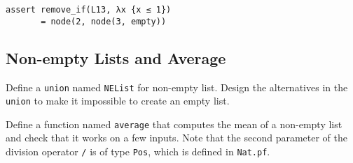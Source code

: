 \documentclass[12pt]{article}
\begin{document}
\begin{verbatim}
assert remove_if(L13, λx {x ≤ 1}) 
       = node(2, node(3, empty))
\end{verbatim}

\subsection{Non-empty Lists and Average}

Define a \texttt{union} named \texttt{NEList} for non-empty list.
Design the alternatives in the \texttt{union} to make it impossible to
create an empty list.

Define a function named \texttt{average} that computes the mean of a
non-empty list and check that it works on a few inputs.
Note that the second parameter of the division operator \texttt{/} 
is of type \texttt{Pos}, which is defined in \texttt{Nat.pf}.
\end{document}
